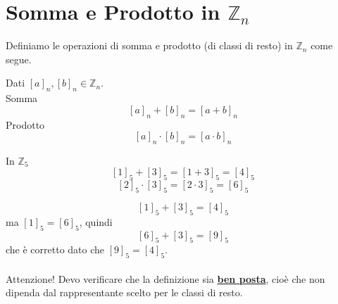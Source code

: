 \documentclass[a4paper,12pt, oneside]{book}
\begin{document}
\section{Somma e Prodotto in $\mathbb{Z}_n$}
Definiamo le operazioni di somma e prodotto (di classi di resto) in $\mathbb{Z}_n$ come segue.
\begin{definizione}
	Dati $[a]_n, [b]_n \in \mathbb{Z}_n$.\\
	Somma $$[a]_n + [b]_n = [a+b]_n$$
	Prodotto $$[a]_n \cdot [b]_n = [a \cdot b]_n$$
\end{definizione}
\begin{shaded}
	\begin{esempio}
		In $\mathbb{Z}_5$\\
		$$[1]_5 + [3]_5 = [1+3]_5 = [4]_5$$
		$$[2]_5 \cdot [3]_5 = [2 \cdot 3]_5 = [6]_5$$
		\begin{nota}
			$$[1]_5 + [3]_5 = [4]_5$$ ma $[1]_5 = [6]_5$, quindi $$[6]_5 + [3]_5 = [9]_5$$ che è corretto dato che $[9]_5 = [4]_5$.\\\\
			Attenzione! Devo verificare che la definizione sia \underline{\textbf{ben posta}}, cioè che non dipenda dal rappresentante scelto per le classi di resto.
		\end{nota}
	\end{esempio}
\end{shaded}
\end{document}
